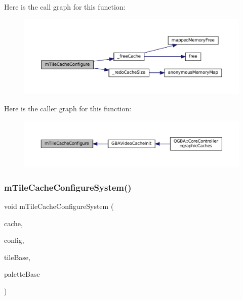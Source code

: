Here is the call graph for this function\+:
\nopagebreak
\begin{figure}[H]
\begin{center}
\leavevmode
\includegraphics[width=350pt]{tile-cache_8c_aac84a3d9543f7c4b29734b064d88bc53_cgraph}
\end{center}
\end{figure}
Here is the caller graph for this function\+:
\nopagebreak
\begin{figure}[H]
\begin{center}
\leavevmode
\includegraphics[width=350pt]{tile-cache_8c_aac84a3d9543f7c4b29734b064d88bc53_icgraph}
\end{center}
\end{figure}
\mbox{\label{tile-cache_8c_a17c8e2e1e7c0b387bcf886e51b3c1fa1}} 
\subsubsection{\texorpdfstring{m\+Tile\+Cache\+Configure\+System()}{mTileCacheConfigureSystem()}}
{\footnotesize\ttfamily void m\+Tile\+Cache\+Configure\+System (\begin{DoxyParamCaption}\item[{struct m\+Tile\+Cache $\ast$}]{cache,  }\item[{m\+Tile\+Cache\+System\+Info}]{config,  }\item[{uint32\+\_\+t}]{tile\+Base,  }\item[{uint32\+\_\+t}]{palette\+Base }\end{DoxyParamCaption})}

